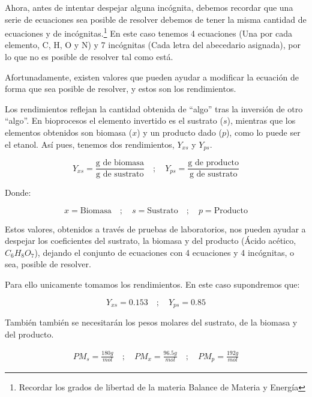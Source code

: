 Ahora, antes de intentar despejar alguna incógnita, debemos recordar que una serie de ecuaciones sea posible de resolver debemos de tener la misma cantidad de ecuaciones y de incógnitas.\footnote{Recordar los grados de libertad de la materia Balance de Materia y Energía} En este caso tenemos 4 ecuaciones (Una por cada elemento, C, H, O y N) y 7 incógnitas (Cada letra del abecedario asignada), por lo que no es posible de resolver tal como está.

Afortunadamente, existen valores que pueden ayudar a modificar la ecuación de forma que sea posible de resolver, y estos son los rendimientos.

Los rendimientos reflejan la cantidad obtenida de ``algo'' tras la inversión de otro ``algo''. En bioprocesos el elemento invertido es el sustrato ($s$), mientras que los elementos obtenidos son biomasa ($x$) y un producto dado ($p$), como lo  puede ser el etanol. Así pues, tenemos dos rendimientos, $Y_{xs}$ y $Y_{ps}$.

\begin{equation*}
    Y_{xs} = \frac{\text{g de biomasa}}{\text{g de sustrato}} \quad ; \quad Y_{ps} = \frac{\text{g de producto}}{\text{g de sustrato}}
\end{equation*}

Donde: 

\begin{equation*}
    x = \text{Biomasa} \quad ; \quad s = \text{Sustrato} \quad ; \quad p = \text{Producto}
\end{equation*}

Estos valores, obtenidos a través de pruebas de laboratorios, nos pueden ayudar a despejar los coeficientes del sustrato, la biomasa y del producto (Ácido acético, $C_{6}H_{8}O_{7}$), dejando el conjunto de ecuaciones con 4 ecuaciones y 4 incógnitas, o sea, posible de resolver.

Para ello unicamente tomamos los rendimientos. En este caso supondremos que:

\begin{equation*}
    Y_{xs} = 0.153 \quad ; \quad Y_{ps} = 0.85
\end{equation*}

También también se necesitarán los pesos molares del sustrato, de la biomasa y del producto.

\begin{align*}
    PM_{s} = \frac{180g}{mol} \quad ; \quad PM_{x} = \frac{96.5g}{mol} \quad ; \quad PM_{p} = \frac{192g}{mol}
\end{align*}

